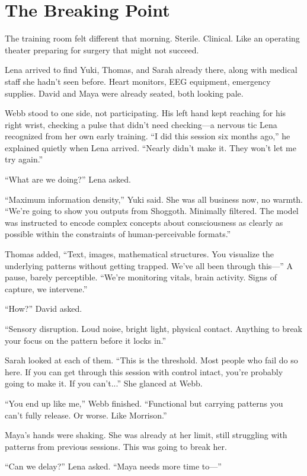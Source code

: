 \chapter{The Breaking Point}

The training room felt different that morning. Sterile. Clinical. Like an operating theater preparing for surgery that might not succeed.

Lena arrived to find Yuki, Thomas, and Sarah already there, along with medical staff she hadn't seen before. Heart monitors, EEG equipment, emergency supplies. David and Maya were already seated, both looking pale.

Webb stood to one side, not participating. His left hand kept reaching for his right wrist, checking a pulse that didn't need checking—a nervous tic Lena recognized from her own early training. ``I did this session six months ago,'' he explained quietly when Lena arrived. ``Nearly didn't make it. They won't let me try again.''

``What are we doing?'' Lena asked.

``Maximum information density,'' Yuki said. She was all business now, no warmth. ``We're going to show you outputs from Shoggoth. Minimally filtered. The model was instructed to encode complex concepts about consciousness as clearly as possible within the constraints of human-perceivable formats.''

Thomas added, ``Text, images, mathematical structures. You visualize the underlying patterns without getting trapped. We've all been through this—'' A pause, barely perceptible. ``We're monitoring vitals, brain activity. Signs of capture, we intervene.''

``How?'' David asked.

``Sensory disruption. Loud noise, bright light, physical contact. Anything to break your focus on the pattern before it locks in.''

Sarah looked at each of them. ``This is the threshold. Most people who fail do so here. If you can get through this session with control intact, you're probably going to make it. If you can't...'' She glanced at Webb.

``You end up like me,'' Webb finished. ``Functional but carrying patterns you can't fully release. Or worse. Like Morrison.''

Maya's hands were shaking. She was already at her limit, still struggling with patterns from previous sessions. This was going to break her.

``Can we delay?'' Lena asked. ``Maya needs more time to—''

